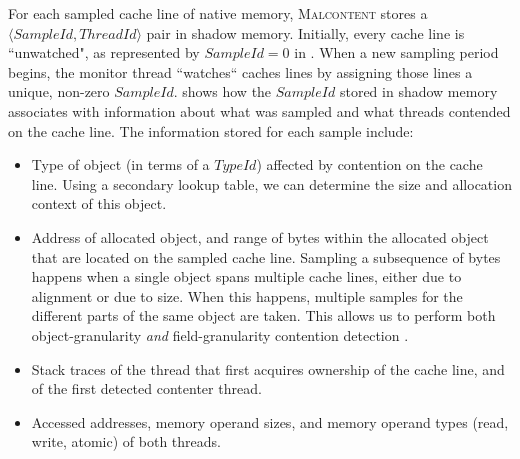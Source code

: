 \documentclass[letterpaper,twocolumn,10pt]{article}
\newcommand{\TextToolname}{Malcontent}
\newcommand{\Toolname}{\textsc{\TextToolname{}}}
\begin{document}
For each sampled cache line of native memory, \Toolname{} stores a $\langle SampleId,ThreadId \rangle$ pair in shadow memory.
Initially, every cache line is ``unwatched", as represented by $SampleId=0$ in . When a new sampling period
begins, the monitor thread ``watches`` caches lines by assigning those lines a unique, non-zero $SampleId$. 
shows how the $SampleId$ stored in shadow memory associates with information about what was sampled and what threads contended on
the cache line. The information stored for each sample include: \begin{itemize}

	\item Type of object (in terms of a $TypeId$) affected by contention on the cache line. Using a secondary lookup table, we can
determine the size and allocation context of this object.

	\item Address of allocated object, and range of bytes within the allocated object that are located on the sampled cache
line. Sampling a subsequence of bytes happens when a single object spans multiple cache lines, either due to alignment or due to size. When
this happens, multiple samples for the different parts of the same object are taken. This allows us to perform both object-granularity
\emph{and} field-granularity contention detection \cite{RaceTrack}.

	\item Stack traces of the thread that first acquires ownership of the cache line, and of the first detected contenter thread.

	\item Accessed addresses, memory operand sizes, and memory operand types (read, write, atomic) of both threads.
\end{itemize}

\end{document}
